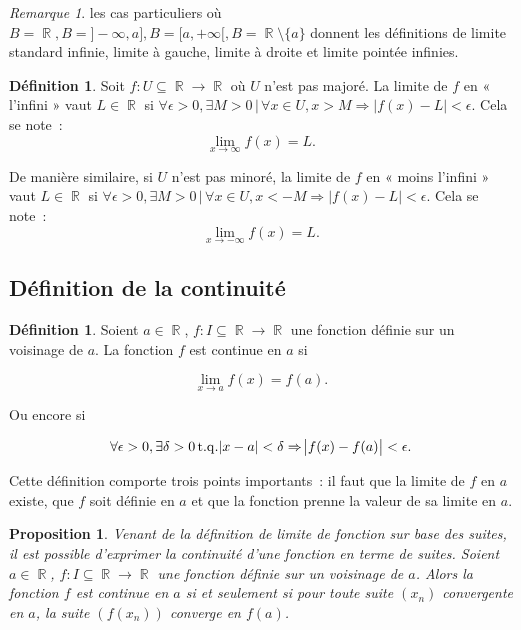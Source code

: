 \documentclass{article}
\DeclareMathOperator{\R}{\mathbb R}
\DeclareMathOperator{\tq}{ t.q. }
\newtheorem{prp}[thm]{Proposition}
\theoremstyle{definition}
\newtheorem{déf}[thm]{Définition}
\theoremstyle{remark}
\newtheorem*{rmq}{Remarque}
\begin{document}
			\begin{rmq} les cas particuliers où $B = \R, B = ]-\infty, a], B = [a, +\infty[, B = \R \setminus \{a\}$ donnent les définitions de limite
			standard infinie, limite à gauche, limite à droite et limite pointée infinies. \end{rmq}

			\begin{déf} Soit $f : U \subseteq \R \to \R$ où $U$ n'est pas majoré. La limite de $f$ en « l'infini » vaut $L \in \R$ si
			$\forall \epsilon > 0, \exists M > 0 \, | \, \forall x \in U, x > M \Rightarrow |f(x) - L| < \epsilon$. Cela se note~:
			\[\lim_{x \to \infty}f(x) = L.\]

			De manière similaire, si $U$ n'est pas minoré, la limite de $f$ en « moins l'infini » vaut $L \in \R$ si
			$\forall \epsilon > 0, \exists M > 0 \, | \, \forall x \in U, x < -M \Rightarrow |f(x) - L| < \epsilon$. Cela se note~:
			\[\lim_{x \to -\infty}f(x) = L.\]
			\end{déf}

	\subsection{Définition de la continuité}
		\begin{déf} Soient $a \in \R$, $f : I \subseteq \R \to \R$ une fonction définie sur un voisinage de $a$. La fonction $f$ est continue en $a$ si

		\[\lim_{x \to a}f(x) = f(a).\]

		Ou encore si

		\[\forall \epsilon > 0, \exists \delta > 0 \tq \abs{x-a} < \delta \Rightarrow \abs{f(x) - f(a)} < \epsilon.\]

		Cette définition comporte trois points importants~: il faut que la limite de $f$ en $a$ existe, que $f$ soit définie en $a$ et que la fonction prenne la valeur
		de sa limite en $a$.
		\end{déf}

		\begin{prp} Venant de la définition de limite de fonction sur base des suites, il est possible d'exprimer la continuité d'une fonction en terme
		de suites. Soient $a \in \R$, $f : I \subseteq \R \to \R$ une fonction définie sur un voisinage de $a$. Alors la fonction $f$ est continue en
		$a$ si et seulement si pour toute suite $(x_n)$ convergente en $a$, la suite $(f(x_n))$ converge en $f(a)$. \end{prp}
\end{document}
